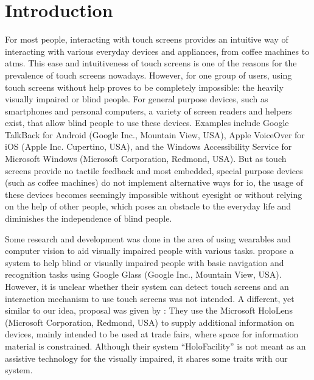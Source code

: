 \section{Introduction}

For most people, interacting with touch screens provides an intuitive way of interacting with various everyday devices and appliances, from coffee machines to \acp{atm}.
This ease and intuitiveness of touch screens is one of the reasons for the prevalence of touch screens nowadays.
However, for one group of users, using touch screens without help proves to be completely impossible: the heavily visually impaired or blind people.
For general purpose devices, such as smartphones and personal computers, a variety of screen readers and helpers exist, that allow blind people to use these devices.
Examples include Google TalkBack for Android \cite{talkback} (Google Inc., Mountain View, USA), Apple VoiceOver for iOS \cite{voiceover} (Apple Inc. Cupertino, USA), and the Windows Accessibility Service for Microsoft Windows \cite{windowsaccessibility} (Microsoft Corporation, Redmond, USA). 
But as touch screens provide  no tactile feedback and most embedded, special purpose devices (such as coffee machines) do not implement alternative ways for \ac{io}, the usage of these devices becomes seemingly impossible without eyesight or without relying on the help of other people, which poses an obstacle to the everyday life and diminishes the independence of blind people.

Some research and development was done in the area of using wearables and computer vision to aid visually impaired people with various tasks.
\textcite{googleglass} propose a system to help blind or visually impaired people with basic navigation and recognition tasks using Google Glass (Google Inc., Mountain View, USA).
However, it is unclear whether their system can detect touch screens and an interaction mechanism to use touch screens was not intended.
A different, yet similar to our idea, proposal was given by \textcite{holofacility}: They use the Microsoft HoloLens (Microsoft Corporation, Redmond, USA) to supply additional information on devices, mainly intended to be used at trade fairs, where space for information material is constrained.
Although their system \enquote{HoloFacility} is not meant as an assistive technology for the visually impaired, it shares some traits with our system.

